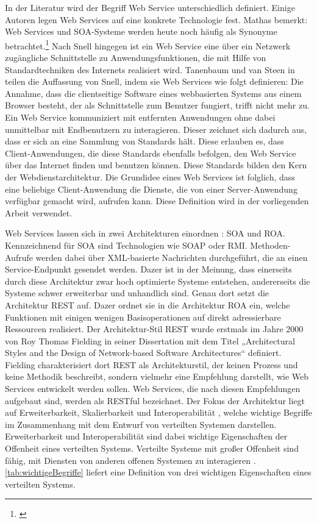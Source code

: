 \documentclass[a4paper,titlepage,halfparskip,12pt,listof=numbered]{scrreprt}
\begin{document}
\begin{onehalfspacing}
In der Literatur wird der Begriff Web Service unterschiedlich definiert. Einige Autoren legen Web Services auf eine konkrete Technologie fest. Mathas bemerkt: \glqq Web Services und SOA-Systeme werden heute noch häufig als Synonyme betrachtet.\grqq \footnote{\cite[S.181]{mathas2008soa}} Nach Snell \cite{snell2002webservice} hingegen ist ein Web Service eine über ein Netzwerk zugängliche Schnittstelle zu Anwendungsfunktionen, die mit Hilfe von Standardtechniken des Internets realisiert wird. Tanenbaum und van Steen in \cite{andrew2008verteilte} teilen die Auffassung von Snell, indem sie Web Services wie folgt definieren: Die Annahme, dass die clientseitige Software eines webbasierten Systems aus einem Browser besteht, der als Schnittstelle zum Benutzer fungiert, trifft nicht mehr zu. Ein Web Service kommuniziert mit entfernten Anwendungen ohne dabei unmittelbar mit Endbenutzern zu interagieren. Dieser zeichnet sich dadurch aus, dass er sich an eine Sammlung von Standards hält. Diese erlauben es, dass Client-Anwendungen, die diese Standards ebenfalls befolgen, den Web Service über das Internet finden und benutzen können. Diese Standards bilden den Kern der Webdienstarchitektur. Die Grundidee eines Web Services ist folglich, dass eine beliebige Client-Anwendung die Dienste, die von einer Server-Anwendung verfügbar gemacht wird, aufrufen kann. Diese Definition wird in der vorliegenden Arbeit verwendet.

Web Services lassen sich in zwei Architekturen einordnen \cite[S.1]{dazerRESTUeberblick}: \ac{SOA} und \ac{ROA}. Kennzeichnend für \ac{SOA} sind Technologien wie \ac{SOAP} oder \ac{RMI}. Methoden-Aufrufe werden dabei über \acs{XML}-basierte Nachrichten durchgeführt, die an einen Service-Endpunkt gesendet werden. Dazer ist in \cite[S.1]{dazerRESTUeberblick} der Meinung, dass einerseits durch diese Architektur zwar hoch optimierte Systeme entstehen, andererseits die Systeme schwer erweiterbar und unhandlich sind. Genau dort setzt die Architektur \ac{REST} auf. Dazer ordnet sie in die Architektur \ac{ROA} ein, welche Funktionen mit einigen wenigen Basisoperationen auf direkt adressierbare Ressourcen realisiert. Der Architektur-Stil REST wurde erstmals im Jahre 2000 von Roy Thomas Fielding in seiner Dissertation mit dem Titel „Architectural Styles and the Design of Network-based Software Architectures“ \cite[S.76]{fieldingREST} definiert. Fielding charakterisiert dort \ac{REST} als Architekturstil, der keinen Prozess und keine Methodik beschreibt, sondern vielmehr eine Empfehlung darstellt, wie Web Services entwickelt werden sollen. Web Services, die nach diesen Empfehlungen aufgebaut sind, werden als \ac{REST}ful bezeichnet. Der Fokus der Architektur liegt auf Erweiterbarkeit, Skalierbarkeit und Interoperabilität \cite[S.105]{fieldingREST}, welche wichtige Begriffe im Zusammenhang mit dem Entwurf von verteilten Systemen darstellen. Erweiterbarkeit und Interoperabilität sind dabei wichtige Eigenschaften der Offenheit eines verteilten Systems. Verteilte Systeme mit großer Offenheit sind fähig, mit Diensten von anderen offenen Systemen zu interagieren \cite[S.25]{andrew2008verteilte}. \autoref{tab:wichtigeBegriffe} liefert eine Definition von drei wichtigen Eigenschaften eines verteilten Systems.


\end{onehalfspacing}
\end{document}

